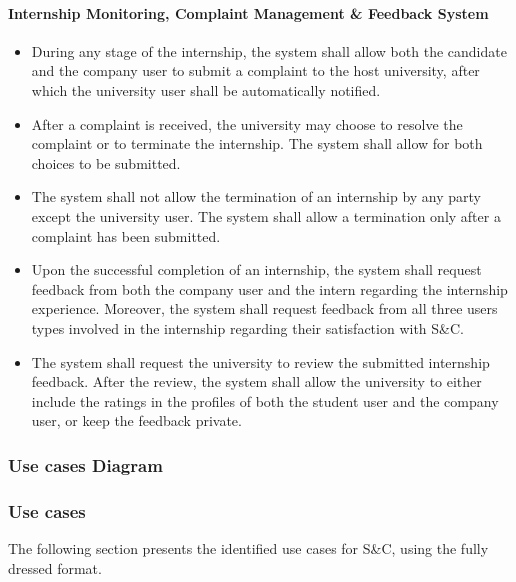 \paragraph{Internship Monitoring, Complaint Management \& Feedback System}
\begin{itemize}[label={[\textbf{FR}]}, align=left, leftmargin=*]
    \item {} During any stage of the internship, the system shall allow both the candidate and the company user to submit a complaint to the host university, after which the university user shall be automatically notified.
    \item {} After a complaint is received, the university may choose to resolve the complaint or to terminate the internship. The system shall allow for both choices to be submitted.
    \item {} The system shall not allow the termination of an internship by any party except the university user. The system shall allow a termination only after a complaint has been submitted.
    \item {} Upon the successful completion of an internship, the system shall request feedback from both the company user and the intern regarding the internship experience. Moreover, the system shall request feedback from all three users types involved in the internship regarding their satisfaction with S\&C.
    \item {} The system shall request the university to review the submitted internship feedback. After the review, the system shall allow the university to either include the ratings in the profiles of both the student user and the company user, or keep the feedback private.
\end{itemize}

\subsubsection{Use cases Diagram}


\pagebreak

\subsubsection{Use cases}
The following section presents the identified use cases for S\&C, using the fully dressed format.

